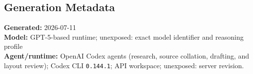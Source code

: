 \begin{deepstudy}
\section*{Generation Metadata}

{\footnotesize
\textbf{Generated:} 2026-07-11\\
\textbf{Model:} GPT-5-based runtime; unexposed: exact model identifier and reasoning profile\\
\textbf{Agent/runtime:} OpenAI Codex agents (research, source collation, drafting, and layout review); Codex CLI \texttt{0.144.1}; API workspace; unexposed: server revision.\par
}

\end{deepstudy}

